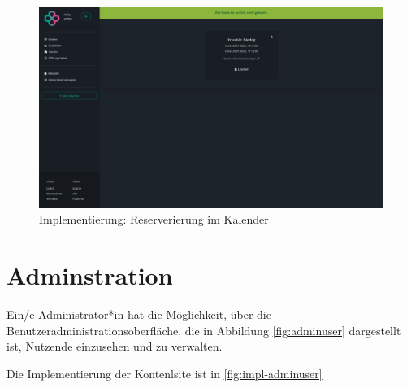 \begin{figure}
    \centering
    \includegraphics[width=\textwidth]{figures/impl-views/bookings_single}
    \caption{Implementierung: Reserverierung im Kalender}
    \label{fig:impl-calendarviewbooking}
\end{figure}
\clearpage


\section{Adminstration}
Ein/e Administrator*in hat die Möglichkeit, über die Benutzeradministrationsoberfläche, die in Abbildung \ref{fig:adminuser} dargestellt ist, Nutzende einzusehen und zu verwalten.

Die Implementierung der Kontenlsite ist in \ref{fig:impl-adminuser}


